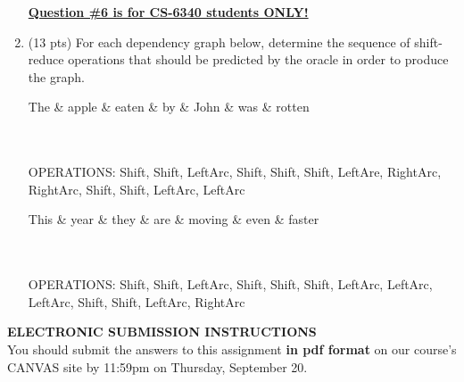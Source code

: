 \documentclass[11pt]{article}
\begin{document}
\begin{enumerate}
\begin{enumerate}
		\vspace{.5in}
	\end{enumerate}

\newpage

\underline{\textbf{Question \#6 is for CS-6340 students ONLY!}}  \\

\item	(13 pts) For each dependency graph below, 
        determine the sequence of shift-reduce operations that should be
        predicted by the oracle in order to produce the graph.\\ 

	\vspace{0.5in}
	\begin{dependency}[edge slant=15pt,label theme = simple, edge theme = iron]
  		\begin{deptext}[column sep=1em]
    			The \& apple \&  eaten \& by \& John \& was \& rotten\\ \\ \\
  		\end{deptext}

		\end{dependency}
		
	OPERATIONS: Shift, Shift, LeftArc, Shift, Shift, Shift, LeftAre, RightArc, RightArc, Shift, Shift, LeftArc, LeftArc

	\vspace{.5in}


	\begin{dependency}[edge slant=15pt,label theme = simple, edge theme = iron]
  	\begin{deptext}[column sep=1em]
    		This \& year \& they \& are \& moving \& even \& faster \\ \\ \\
  	\end{deptext}
	\end{dependency}
	
	OPERATIONS: Shift, Shift, LeftArc, Shift, Shift, Shift, LeftArc, LeftArc, LeftArc, Shift, Shift, LeftArc, RightArc
	
	\vspace{1in}
	

\end{enumerate}  %


\newpage
\hspace*{1.5in}  {\bf ELECTRONIC SUBMISSION INSTRUCTIONS} \\

You should submit the answers to this assignment {\bf in pdf format}
on our course's CANVAS site by 11:59pm on Thursday, September 20.
\end{document}
